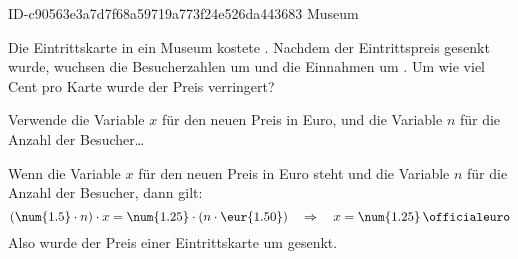 \begin{exercise}
      {ID-c90563e3a7d7f68a59719a773f24e526da443683}
      {Museum}
  \ifproblem\problem\par
    Die Eintrittskarte in ein Museum kostete . Nachdem der Eintrittspreis
    gesenkt wurde, wuchsen die Besucherzahlen um  und die Einnahmen um .
    Um wie viel Cent pro Karte wurde der Preis verringert?
  \fi
  \ifoutline\outline\par
    Verwende die Variable $x$ für den neuen Preis in Euro, und die Variable $n$ für
    die Anzahl der Besucher\ldots
  \fi
  \ifoutcome\outcome\par
    Wenn die Variable $x$ für den neuen Preis in Euro steht und die Variable $n$ für
    die Anzahl der Besucher, dann gilt:
    \begin{equation*}
      (\num{1.5}\cdot n)\cdot x=\num{1.25}\cdot(n\cdot\eur{1.50})
      \quad\Rightarrow\quad
      x=\num{1.25}\,\text{\officialeuro}
    \end{equation*}
    Also wurde der Preis einer Eintrittskarte um  gesenkt.
  \fi
\end{exercise}
